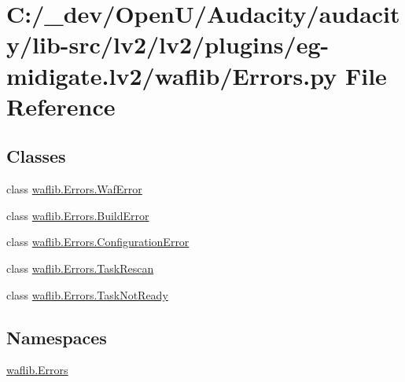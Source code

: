 \hypertarget{lv2_2plugins_2eg-midigate_8lv2_2waflib_2_errors_8py}{}\section{C\+:/\+\_\+dev/\+Open\+U/\+Audacity/audacity/lib-\/src/lv2/lv2/plugins/eg-\/midigate.lv2/waflib/\+Errors.py File Reference}
\label{lv2_2plugins_2eg-midigate_8lv2_2waflib_2_errors_8py}
\subsection*{Classes}
\begin{DoxyCompactItemize}
\item 
class \hyperlink{classwaflib_1_1_errors_1_1_waf_error}{waflib.\+Errors.\+Waf\+Error}
\item 
class \hyperlink{classwaflib_1_1_errors_1_1_build_error}{waflib.\+Errors.\+Build\+Error}
\item 
class \hyperlink{classwaflib_1_1_errors_1_1_configuration_error}{waflib.\+Errors.\+Configuration\+Error}
\item 
class \hyperlink{classwaflib_1_1_errors_1_1_task_rescan}{waflib.\+Errors.\+Task\+Rescan}
\item 
class \hyperlink{classwaflib_1_1_errors_1_1_task_not_ready}{waflib.\+Errors.\+Task\+Not\+Ready}
\end{DoxyCompactItemize}
\subsection*{Namespaces}
\begin{DoxyCompactItemize}
\item 
 \hyperlink{namespacewaflib_1_1_errors}{waflib.\+Errors}
\end{DoxyCompactItemize}
